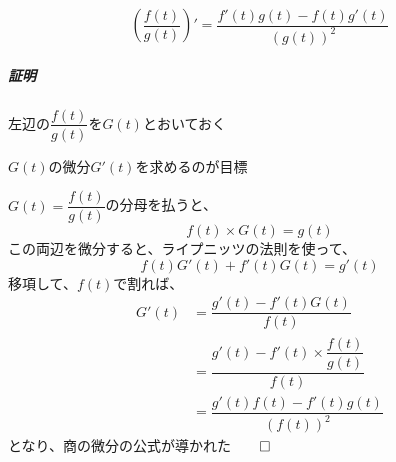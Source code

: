 \documentclass[../book_jiriki_calc]{subfiles}
\begin{document}
\begin{equation}
  \left( \frac{f(t)}{g(t)} \right)' = \frac{f'(t)g(t) - f(t)g'(t)}{(g(t))^2}
\end{equation}

\sectionline

\subparagraph{証明}

左辺の$\dfrac{f(t)}{g(t)}$を$G(t)$とおいておく

$G(t)$の微分$G'(t)$を求めるのが目標

\br

$G(t)=\dfrac{f(t)}{g(t)}$の分母を払うと、
\begin{equation}
  f(t) \times G(t) = g(t)
\end{equation}
この両辺を微分すると、ライプニッツの法則を使って、
\begin{equation}
  f(t)G'(t) + f'(t)G(t) = g'(t)
\end{equation}
移項して、$f(t)$で割れば、
\begin{align}
  G'(t) & = \dfrac{g'(t) - f'(t)G(t)}{f(t)}                       \\
        & = \dfrac{g'(t) - f'(t) \times \dfrac{f(t)}{g(t)}}{f(t)} \\
        & = \dfrac{g'(t)f(t) - f'(t)g(t)}{(f(t))^2}
\end{align}
となり、商の微分の公式が導かれた$\qed$
\end{document}

